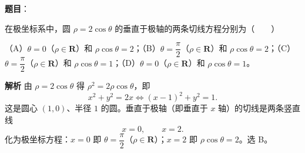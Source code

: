 \begin{answer}

\textbf{题目}：

在极坐标系中，圆 $\rho=2\cos\theta$ 的垂直于极轴的两条切线方程分别为\mbox{（　　）}

（A）$\theta=0$（$\rho\in\mathbf R$）和 $\rho\cos\theta=2$；（B）$\theta=\dfrac{\pi}{2}$（$\rho\in\mathbf R$）和 $\rho\cos\theta=2$；（C）$\theta=\dfrac{\pi}{2}$（$\rho\in\mathbf R$）和 $\rho\cos\theta=1$；（D）$\theta=0$（$\rho\in\mathbf R$）和 $\rho\cos\theta=1$。

\textbf{解析}
由 $\rho=2\cos\theta$ 得 $\rho^2=2\rho\cos\theta$，即
\nopagebreak[4]
\[x^2+y^2=2x\Longleftrightarrow (x-1)^2+y^2=1.\]
这是圆心 $(1,0)$、半径 $1$ 的圆。垂直于极轴（即垂直于 $x$ 轴）的切线是两条竖直线
\nopagebreak[4]
\[x=0,\qquad x=2.\]
化为极坐标方程：$x=0$ 即 $\theta=\dfrac{\pi}{2}$（$\rho\in\mathbf R$）；$x=2$ 即 $\rho\cos\theta=2$。选 B。


\end{answer}
